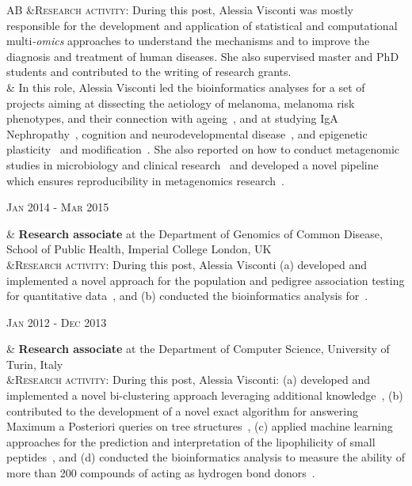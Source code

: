 \documentclass[a4paper,10pt]{article}
\newenvironment{doubletablelist}
{
	\vspace{-0.2cm}
	\begin{longtable}[!h]{AB}}{\end{longtable}
}
\newcommand{\dtlist}[2]{
\hspace{-3cm}
\noindent
	\begin{minipage}{0.22\textwidth}
	\begin{flushright}
	\textsc{#1}
	\end{flushright}
	\end{minipage}
	& #2\\[0.2cm]
}
\begin{document}
\begin{doubletablelist}
{	&\textsc{Research activity}: During this post, Alessia Visconti was mostly responsible for the development and application of statistical and computational multi\emph{-omics} approaches to understand the mechanisms and to improve the diagnosis and treatment of human diseases. She also supervised master and PhD students and contributed to the writing of research grants.\\
	 & In this role, Alessia Visconti led the bioinformatics analyses for a set of projects aiming at dissecting the aetiology of melanoma, melanoma risk phenotypes, and their connection with ageing~\cite{Rib16,Hys18,Vis18a,Duf17}, and at studying IgA Nephropathy~\cite{Lom16}, cognition and neurodevelopmental disease~\cite{Cul18}, and epigenetic plasticity~\cite{Car16} and modification~\cite{Zag18}. She also reported on how to conduct metagenomic studies in microbiology and clinical research~\cite{Vis18c} and developed a novel pipeline which ensures reproducibility in metagenomics research~\cite{Vis18b}.%
	}
    \dtlist{Jan 2014 - Mar 2015}{\textbf{Research associate} at the Department of Genomics of Common Disease, School of Public Health, Imperial College London, UK  \\
	 &\textsc{Research activity}: During this post, Alessia Visconti (a) developed and implemented a novel approach for the population and pedigree association testing for quantitative data~\cite{Vis16}, and (b) conducted the bioinformatics analysis for~\cite{Joh15,AlM15,Gia16,Pui16}.%
	}
	\dtlist{Jan 2012 - Dec 2013}{\textbf{Research associate} at the Department of Computer Science, University of Turin, Italy \\ %
	 &\textsc{Research activity}: During this post, Alessia Visconti: (a) developed and implemented a novel bi-clustering approach leveraging additional knowledge~\cite{Vis13a}, (b) contributed to the development of a novel exact algorithm for answering Maximum a Posteriori queries on tree structures~\cite{Esp13}, (c) applied machine learning approaches for the prediction and interpretation of the lipophilicity of small peptides~\cite{Vis15a}, and (d) conducted the bioinformatics analysis to measure the ability of more than 200 compounds of acting as hydrogen bond donors~\cite{Erm14}.%
}
\end{doubletablelist}
\end{document}
